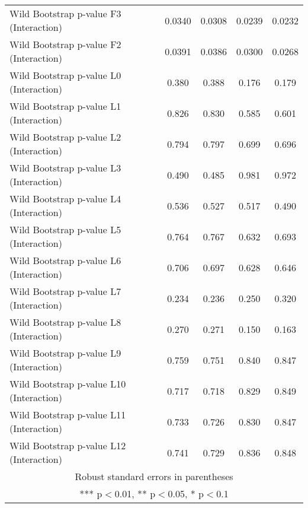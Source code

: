 \documentclass[]{article}
\begin{document}
\begin{tabular}{lcccc}
Wild Bootstrap p-value F3 (Interaction) & 0.0340 & 0.0308 & 0.0239 & 0.0232 \\
Wild Bootstrap p-value F2 (Interaction) & 0.0391 & 0.0386 & 0.0300 & 0.0268 \\
Wild Bootstrap p-value L0 (Interaction) & 0.380 & 0.388 & 0.176 & 0.179 \\
Wild Bootstrap p-value L1 (Interaction) & 0.826 & 0.830 & 0.585 & 0.601 \\
Wild Bootstrap p-value L2 (Interaction) & 0.794 & 0.797 & 0.699 & 0.696 \\
Wild Bootstrap p-value L3 (Interaction) & 0.490 & 0.485 & 0.981 & 0.972 \\
Wild Bootstrap p-value L4 (Interaction) & 0.536 & 0.527 & 0.517 & 0.490 \\
Wild Bootstrap p-value L5 (Interaction) & 0.764 & 0.767 & 0.632 & 0.693 \\
Wild Bootstrap p-value L6 (Interaction) & 0.706 & 0.697 & 0.628 & 0.646 \\
Wild Bootstrap p-value L7 (Interaction) & 0.234 & 0.236 & 0.250 & 0.320 \\
Wild Bootstrap p-value L8 (Interaction) & 0.270 & 0.271 & 0.150 & 0.163 \\
Wild Bootstrap p-value L9 (Interaction) & 0.759 & 0.751 & 0.840 & 0.847 \\
Wild Bootstrap p-value L10 (Interaction) & 0.717 & 0.718 & 0.829 & 0.849 \\
Wild Bootstrap p-value L11 (Interaction) & 0.733 & 0.726 & 0.830 & 0.847 \\
 Wild Bootstrap p-value L12 (Interaction) & 0.741 & 0.729 & 0.836 & 0.848 \\ \hline
\multicolumn{5}{c}{ Robust standard errors in parentheses} \\
\multicolumn{5}{c}{ *** p$<$0.01, ** p$<$0.05, * p$<$0.1} \\
\end{tabular}
\end{document}
